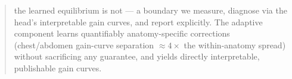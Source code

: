 \begin{abstract}
the learned equilibrium is not --- a boundary we measure, diagnose via the head's interpretable gain curves, and report explicitly. The adaptive component learns quantifiably anatomy-specific corrections (chest/abdomen gain-curve separation ${\approx}4\times$ the within-anatomy spread) without sacrificing any guarantee, and yields directly interpretable, publishable gain curves.
\end{abstract}
\vspace{0.5em}
